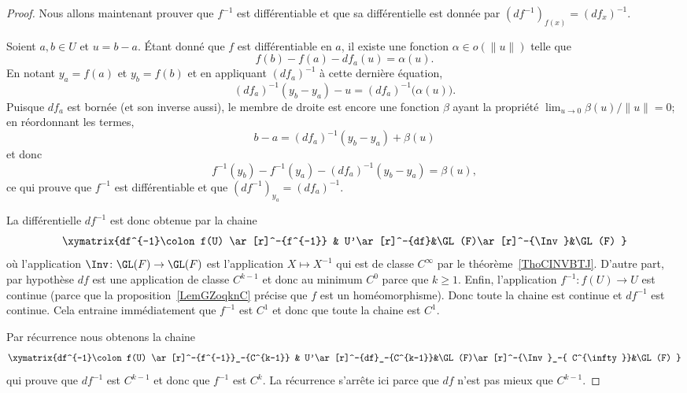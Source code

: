 \begin{proof}
    Nous allons maintenant prouver que \( f^{-1}\) est différentiable et que sa différentielle est donnée par \( (df^{-1})_{f(x)}=(df_x)^{-1}\).

    Soient \( a,b\in U\) et \( u=b-a\). Étant donné que \( f\) est différentiable en \( a\), il existe une fonction \( \alpha\in o(\| u \|)\) telle que
    \begin{equation}
        f(b)-f(a)-df_a(u)=\alpha(u).
    \end{equation}
    En notant \( y_a=f(a)\) et \( y_b=f(b)\) et en appliquant \( (df_a)^{-1}\) à cette dernière équation,
    \begin{equation}
        (df_a)^{-1}(y_b-y_a)-u=(df_a)^{-1} \big( \alpha(u) \big).
    \end{equation}
    Puisque \( df_a\) est bornée (et son inverse aussi), le membre de droite est encore une fonction \( \beta\) ayant la propriété \( \lim_{u\to 0}\beta(u)/\| u \|=0\); en réordonnant les termes,
    \begin{equation}
        b-a=(df_a)^{-1}(y_b-y_a)+\beta(u)
    \end{equation}
    et donc
    \begin{equation}
        f^{-1}(y_b)-f^{-1}(y_a)-(df_a)^{-1}(y_b-y_a)=\beta(u),
    \end{equation}
    ce qui prouve que \( f^{-1}\) est différentiable et que \( (df^{-1})_{y_a}=(df_a)^{-1}\).

    La différentielle \( df^{-1}\) est donc obtenue par la chaine
    \begin{equation}
    \xymatrix{%
        df^{-1}\colon f(U) \ar[r]^-{f^{-1}}     &   U'\ar[r]^-{df}&\GL(F)\ar[r]^-{\Inv}&\GL(F)
       }
    \end{equation}
    où l'application \( \Inv\colon \GL(F)\to \GL(F)\) est l'application \( X\mapsto X^{-1}\) qui est de classe \(  C^{\infty}\) par le théorème~\ref{ThoCINVBTJ}. D'autre part, par hypothèse \( df\) est une application de classe \( C^{k-1}\) et donc au minimum \( C^0\) parce que \( k\geq 1\). Enfin, l'application \( f^{-1}\colon f(U)\to U\) est continue (parce que la proposition~\ref{LemGZoqknC} précise que \( f\) est un homéomorphisme). Donc toute la chaine est continue et \( df^{-1}\) est continue. Cela entraine immédiatement que \( f^{-1}\) est \( C^1\) et donc que toute la chaine est \( C^1\).

    Par récurrence nous obtenons la chaine
    \begin{equation}
    \xymatrix{%
        df^{-1}\colon f(U) \ar[r]^-{f^{-1}}_-{C^{k-1}}     &   U'\ar[r]^-{df}_-{C^{k-1}}&\GL(F)\ar[r]^-{\Inv}_-{ C^{\infty}}&\GL(F)
       }
    \end{equation}
    qui prouve que \( df^{-1}\) est \( C^{k-1} \) et donc que \( f^{-1}\) est \( C^k\). La récurrence s'arrête ici parce que \( df\) n'est pas mieux que \( C^{k-1}\).
\end{proof}

